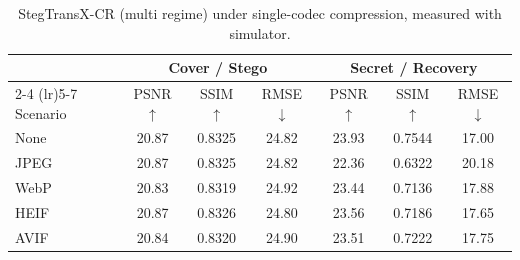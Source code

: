\begin{table}[t]
\centering
\caption{StegTransX-CR (multi regime) under single-codec compression, measured with simulator.}
\label{tab:multi-single-sim}
\begin{tabular}{lcccccc}
\toprule
& \multicolumn{3}{c}{Cover / Stego} & \multicolumn{3}{c}{Secret / Recovery} \\
\cmidrule(lr){2-4} \cmidrule(lr){5-7}
Scenario & PSNR $\uparrow$ & SSIM $\uparrow$ & RMSE $\downarrow$ & PSNR $\uparrow$ & SSIM $\uparrow$ & RMSE $\downarrow$ \\
\midrule
None & 20.87 & 0.8325 & 24.82 & 23.93 & 0.7544 & 17.00 \\
JPEG & 20.87 & 0.8325 & 24.82 & 22.36 & 0.6322 & 20.18 \\
WebP & 20.83 & 0.8319 & 24.92 & 23.44 & 0.7136 & 17.88 \\
HEIF & 20.87 & 0.8326 & 24.80 & 23.56 & 0.7186 & 17.65 \\
AVIF & 20.84 & 0.8320 & 24.90 & 23.51 & 0.7222 & 17.75 \\
\bottomrule
\end{tabular}
\end{table}
